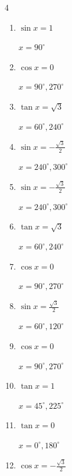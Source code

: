 \begin{multicols}{4}
\begin{enumerate}
        $\displaystyle x = 150^{\circ} , 210^{\circ}$

  \item $\displaystyle \sin{x}  = 1$

        $\displaystyle x = 90^{\circ}$

  \item $\displaystyle \cos{x}  = 0$

        $\displaystyle x = 90^{\circ} , 270^{\circ}$

  \item $\displaystyle \tan{x}  = \sqrt{3}$

        $\displaystyle x = 60^{\circ} , 240^{\circ}$

\columnbreak %

  \item $\displaystyle \sin{x}  = -\frac{\sqrt{3}}{2}$

        $\displaystyle x = 240^{\circ} , 300^{\circ}$

  \item $\displaystyle \sin{x}  = -\frac{\sqrt{3}}{2}$

        $\displaystyle x = 240^{\circ} , 300^{\circ}$

  \item $\displaystyle \tan{x}  = \sqrt{3}$

        $\displaystyle x = 60^{\circ} , 240^{\circ}$

  \item $\displaystyle \cos{x}  = 0$

        $\displaystyle x = 90^{\circ} , 270^{\circ}$

  \item $\displaystyle \sin{x}  = \frac{\sqrt{3}}{2}$

        $\displaystyle x = 60^{\circ} , 120^{\circ}$

  \item $\displaystyle \cos{x}  = 0$

        $\displaystyle x = 90^{\circ} , 270^{\circ}$

  \item $\displaystyle \tan{x}  = 1$

        $\displaystyle x = 45^{\circ} , 225^{\circ}$

  \item $\displaystyle \tan{x}  = 0$

        $\displaystyle x = 0^{\circ} , 180^{\circ}$

  \item $\displaystyle \cos{x}  = -\frac{\sqrt{3}}{2}$


\end{enumerate}
\end{multicols}
